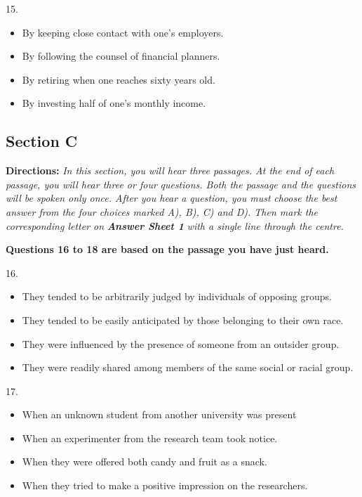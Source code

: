 \documentclass[UTF8,11pt]{ctexart}
\begin{document}
15.


\begin{itemize}[leftmargin=2em,itemsep=.2em,topsep=.4em]\item[A.] By keeping close contact with one’s employers.
\item[B.] By following the counsel of financial planners.
\item[C.] By retiring when one reaches sixty years old.
\item[D.] By investing half of one’s monthly income.
\end{itemize}

\subsection*{\textbf{Section C}}


\textbf{Directions:}\textit{ In this section, you will hear three passages. At the end of each passage, you will hear three or four} \textit{questions. Both the passage and the questions will be spoken only once. After you hear a question, you must} \textit{choose the best answer from the four choices marked A), B), C) and D). Then mark the corresponding letter on} \textbf{\textit{Answer Sheet 1}}\textit{ with a single line through the centre.}


\textbf{Questions 16 to 18 are based on the passage you have just heard.}


16.


\begin{itemize}[leftmargin=2em,itemsep=.2em,topsep=.4em]\item[A.] They tended to be arbitrarily judged by individuals of opposing groups.
\item[B.] They tended to be easily anticipated by those belonging to their own race.
\item[C.] They were influenced by the presence of someone from an outsider group.
\item[D.] They were readily shared among members of the same social or racial group.
\end{itemize}

17.


\begin{itemize}[leftmargin=2em,itemsep=.2em,topsep=.4em]\item[A.] When an unknown student from another university was present
\item[B.] When an experimenter from the research team took notice.
\item[C.] When they were offered both candy and fruit as a snack.
\item[D.] When they tried to make a positive impression on the researchers.
\end{itemize}
\end{document}
